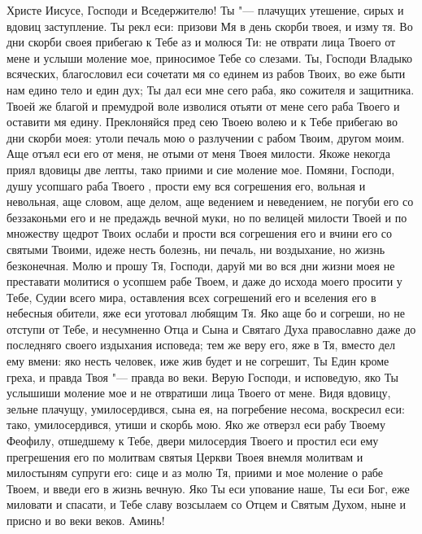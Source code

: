 \begin{mymulticols}


Христе Иисусе, Господи и Вседержителю! Ты "--- плачущих утешение, сирых и вдовиц заступление. Ты рекл еси: призови Мя в день скорби твоея, и изму тя. Во дни скорби своея прибегаю к Тебе аз и молюся Ти: не отврати лица Твоего от мене и услыши моление мое, приносимое Тебе со слезами. Ты, Господи Владыко всяческих, благословил еси сочетати мя со единем из рабов Твоих, во еже быти нам едино тело и един дух; Ты дал еси мне сего раба, яко сожителя и защитника. Твоей же благой и премудрой воле изволися отьяти от мене сего раба Твоего и оставити мя едину. Преклоняйся пред сею Твоею волею и к Тебе прибегаю во дни скорби моея: утоли печаль мою о разлучении с рабом Твоим, другом моим. Аще отъял еси его от меня, не отыми от меня Твоея милости. Якоже некогда приял вдовицы две лепты, тако приими и сие моление мое. Помяни, Господи, душу усопшаго раба Твоего , прости ему вся согрешения его, вольная и невольная, аще словом, аще делом, аще ведением и неведением, не погуби его со беззаконьми его и не предаждь вечной муки, но по велицей милости Твоей и по множеству щедрот Твоих ослаби и прости вся согрешения его и вчини его со святыми Твоими, идеже несть болезнь, ни печаль, ни воздыхание, но жизнь безконечная. Молю и прошу Тя, Господи, даруй ми во вся дни жизни моея не преставати молитися о усопшем рабе Твоем, и даже до исхода моего просити у Тебе, Судии всего мира, оставления всех согрешений его и вселения его в небесныя обители, яже еси уготовал любящим Тя. Яко аще бо и согреши, но не отступи от Тебе, и несумненно Отца и Сына и Святаго Духа православно даже до последняго своего издыхания исповеда; тем же веру его, яже в Тя, вместо дел ему вмени: яко несть человек, иже жив будет и не согрешит, Ты Един кроме греха, и правда Твоя "--- правда во веки. Верую Господи, и исповедую, яко Ты услышиши моление мое и не отвратиши лица Твоего от мене. Видя вдовицу, зельне плачущу, умилосердився, сына ея, на погребение несома, воскресил еси: тако, умилосердився, утиши и скорбь мою. Яко же отверзл еси рабу Твоему Феофилу, отшедшему к Тебе, двери милосердия Твоего и простил еси ему прегрешения его по молитвам святыя Церкви Твоея внемля молитвам и милостыням супруги его: сице и аз молю Тя, приими и мое моление о рабе Твоем, и введи его в жизнь вечную. Яко Ты еси упование наше, Ты еси Бог, еже миловати и спасати, и Тебе славу возсылаем со Отцем и Святым Духом, ныне и присно и во веки веков. Аминь!

\end{mymulticols}

